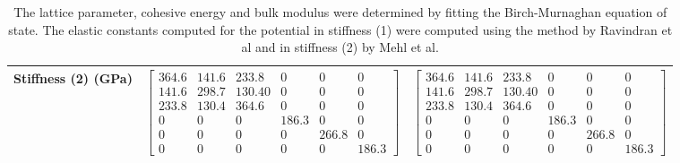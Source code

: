 \begin{table}[ht]
\begin{tabular}{lcccccc}
Stiffness (2) (GPa) & \multicolumn{3}{c}{$\begin{bmatrix} 364.6 & 141.6 & 233.8 & 0 & 0 & 0 \\ 141.6 & 298.7 & 130.40 & 0 & 0 & 0 \\ 233.8 & 130.4 & 364.6 & 0 & 0 & 0 \\ 0 & 0 & 0 & 186.3 & 0 & 0 \\ 0 & 0 & 0 & 0 & 266.8 & 0 \\ 0 & 0 & 0 & 0 & 0 & 186.3 \end{bmatrix}$}   & \multicolumn{3}{c}{$\begin{bmatrix} 364.6 & 141.6 & 233.8 & 0 & 0 & 0 \\ 141.6 & 298.7 & 130.40 & 0 & 0 & 0 \\ 233.8 & 130.4 & 364.6 & 0 & 0 & 0 \\ 0 & 0 & 0 & 186.3 & 0 & 0 \\ 0 & 0 & 0 & 0 & 266.8 & 0 \\ 0 & 0 & 0 & 0 & 0 & 186.3 \end{bmatrix}$} \\
\hline\hline
\end{tabular}
\caption{The lattice parameter, cohesive energy and bulk modulus were determined by fitting the Birch-Murnaghan equation of state.  The elastic constants computed for the potential in stiffness (1) were computed using the method by Ravindran et al\cite{dfttisiravindran} and in stiffness (2) by Mehl et al\cite{mehlsp}\cite{elasticpropertiesmehl}.}
\label{table:fedftvspotential}
\end{table}














